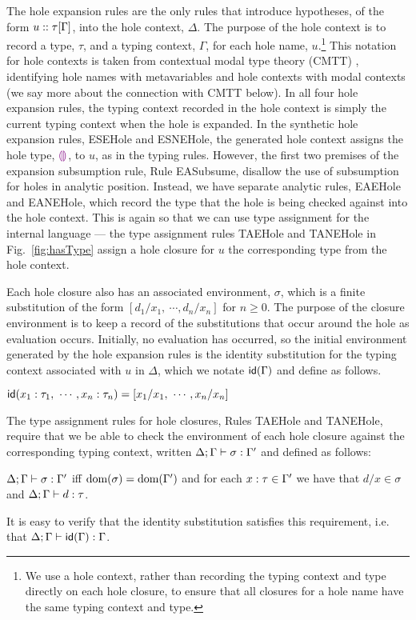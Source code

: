 The hole expansion rules are the only rules that introduce hypotheses, of the form $u :: \tau[\Gamma]$, into the hole context, $\Delta$. The purpose of the hole context is to record a type, $\tau$, and a typing context, $\Gamma$,   for each hole name, $u$.\footnote{We use a hole context, rather than recording the typing context and type directly on each hole closure, to ensure that all closures for a hole name have the same typing context and type.} This notation for hole contexts is taken from contextual modal type theory (CMTT) \cite{Nanevski2008}, identifying hole names with metavariables and hole contexts with modal contexts (we say more about the connection with CMTT below). In all four hole expansion rules, the typing context recorded in the hole context is simply the current typing context when the hole is expanded. In the synthetic hole expansion rules, {ESEHole} and {ESNEHole}, the generated hole context assigns the hole type, $\textcolor{violet}{\llparenthesis}\textcolor{violet}{\rrparenthesis}$, to $u$, as in the typing rules. However, the first two premises of the expansion subsumption rule, Rule EASubsume, disallow the use of subsumption for holes in analytic position. Instead, we have separate analytic rules, {EAEHole} and {EANEHole}, which record the type that the hole is being checked against into the hole context. This is again so that we can use type assignment for the internal language --- the type assignment rules TAEHole and TANEHole in Fig.~\ref{fig:hasType} assign a hole closure for $u$ the corresponding type from the hole context.

Each hole closure also has an associated environment, $\sigma$, which is a finite substitution of the form $[d_1/x_1, ~\cdots, d_n/x_n]$ for $n \geq 0$.  The purpose of the closure environment is to keep a record of the substitutions that occur around the hole as evaluation occurs. Initially, no evaluation has occurred, so the initial environment generated by the hole expansion rules is the identity substitution for the typing context associated with $u$ in $\Delta$, which we notate $\mathsf{id}(\Gamma)$ and define as follows.
\begin{defn} $\mathsf{id}(x_1 : \tau_1, ~\cdots, x_n : \tau_n) = [x_1/x_1, ~\cdots, x_n/x_n]$
\end{defn}
\noindent
The type assignment rules for hole closures, Rules TAEHole and TANEHole, require that we be able to check the environment of each hole closure against the corresponding typing context, written $\Delta; \Gamma \vdash \sigma : \Gamma'$ and defined as follows:
\begin{defn}
$\Delta; \Gamma \vdash \sigma : \Gamma'$ iff $\text{dom}(\sigma) = \text{dom}(\Gamma')$ and for each $x : \tau \in \Gamma'$ we have that $d/x \in \sigma$ and $\Delta; \Gamma \vdash d : \tau$.
\end{defn}
\noindent
It is easy to verify that the identity substitution satisfies this requirement, i.e. that $\Delta; \Gamma \vdash \mathsf{id}(\Gamma) : \Gamma$. 

